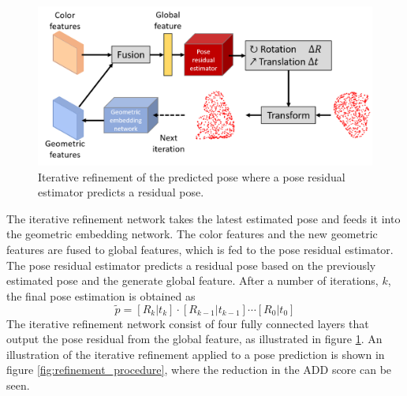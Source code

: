 \documentclass[../main.tex]{subfiles}
\begin{document}
\begin{figure}[H]
    \centering
    \includegraphics[width=\textwidth]{figures/dense_fusion/iterative_refinement.png}
    \caption{Iterative refinement of the predicted pose where a pose residual estimator predicts a residual pose.}
    \label{fig:iterative_refinement}
\end{figure}

The iterative refinement network takes the latest estimated pose and feeds it into the geometric embedding network. The color features and the new geometric features are fused to global features, which is fed to the pose residual estimator. The pose residual estimator predicts a residual pose based on the previously estimated pose and the generate global feature. After a number of iterations, $k$, the final pose estimation is obtained as
\begin{equation}
    \label{eqn:final_pose_estimation}
    \tilde{p} = [R_k | t_k] \cdot [R_{k-1} | t_{k-1}] \cdots [R_0 | t_0]
\end{equation}
The iterative refinement network consist of four fully connected layers that output the pose residual from the global feature, as illustrated in figure \ref{fig:iterative_refinement}. An illustration of the iterative refinement applied to a pose prediction is shown in figure \ref{fig:refinement_procedure}, where the reduction in the ADD score can be seen.
\end{document}
